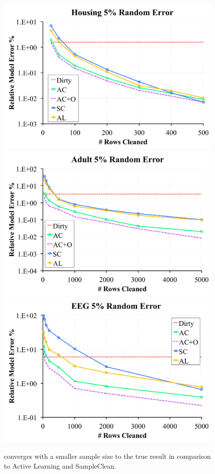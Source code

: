\begin{figure}[t]
\centering
 \includegraphics[scale=0.15]{exp/exp3a.pdf}
 \includegraphics[scale=0.15]{exp/exp3b.pdf}
  \includegraphics[scale=0.15]{exp/exp3c.pdf}
 \caption{\sys converges with a smaller sample size to the true result in comparison to Active Learning and SampleClean. \label{prio-perf}}
\end{figure}

